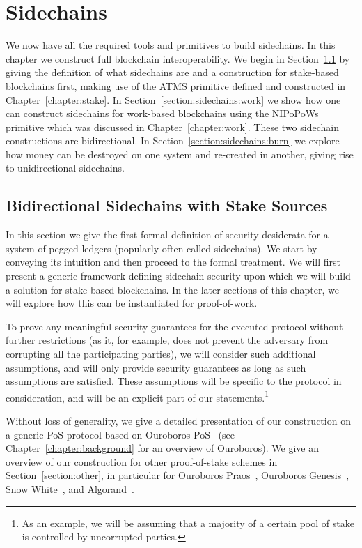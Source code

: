 \chapter{Sidechains}\label{chapter:sidechains}


We now have all the required tools and primitives to build sidechains. In this chapter we construct full blockchain interoperability.
We begin in Section~\ref{section:sidechains:stake} by giving the definition of what sidechains are and a construction for stake-based blockchains first, making use of the ATMS primitive defined and constructed in Chapter~\ref{chapter:stake}.
In Section~\ref{section:sidechains:work} we show how one can construct sidechains for work-based blockchains using the NIPoPoWs primitive which was discussed in Chapter~\ref{chapter:work}. These two sidechain constructions are bidirectional.
In Section~\ref{section:sidechains:burn} we explore how money can be destroyed on one system and re-created in another, giving rise to unidirectional sidechains.

\section{Bidirectional Sidechains with Stake Sources}\label{section:sidechains:stake}
In this section we give the first formal definition of security desiderata for
a system of pegged ledgers (popularly often called sidechains).
We start by conveying its intuition and then proceed to the formal treatment. We will first present a generic framework defining sidechain security upon which we will build a solution for stake-based blockchains. In the later sections of this chapter, we will explore how this can be instantiated for proof-of-work.

To prove any meaningful security
guarantees for the executed protocol without further restrictions (as it, for
example, does not prevent the adversary from corrupting all the participating
parties), we will consider such additional
assumptions, and will only
provide security guarantees as long as such assumptions are satisfied.
These assumptions will be specific to the protocol in consideration, and will be an
explicit part of our statements.\footnote{As an example, we will be assuming that a
majority of a certain pool of stake is controlled by uncorrupted parties.}

Without loss of generality, we give a detailed presentation of our construction on a generic PoS protocol
 based on Ouroboros PoS~\cite{ouroboros} (see Chapter~\ref{chapter:background} for an overview of Ouroboros). We give an overview of our construction for other proof-of-stake schemes in Section~\ref{section:other}, in particular for Ouroboros
Praos~\cite{praos}, Ouroboros Genesis~\cite{genesis}, Snow
White~\cite{snowwhite}, and Algorand~\cite{algorand}.

